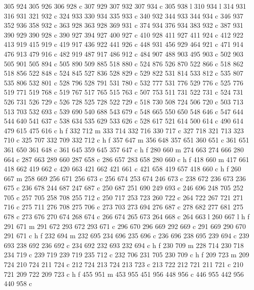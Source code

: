{{   305 924 305 926 306 928 c
   307 929 307 932 307 934 c
   305 938 l
   310 934 l
   314 931 316 931 321 932 c
   324 933 330 934 335 933 c
   340 932 344 933 344 934 c
   346 937 352 936 358 932 c
   363 928 363 928 369 931 c
   374 934 376 934 383 932 c
   387 931 390 929 390 928 c
   390 927 394 927 400 927 c
   410 928 411 927 411 924 c
   412 922 413 919 415 919 c
   419 917 436 922 441 926 c
   448 931 456 929 464 921 c
   471 914 476 913 479 916 c
   482 919 487 917 486 912 c
   484 907 488 903 495 903 c
   502 903 505 901 505 894 c
   505 890 509 885 518 880 c
   524 876 526 870 522 866 c
   518 862 518 856 522 848 c
   524 845 527 836 528 829 c
   529 822 531 814 533 812 c
   535 807 535 806 532 801 c
   528 796 528 791 531 780 c
   532 777 531 776 529 776 c
   525 776 519 771 519 768 c
   519 767 517 765 515 763 c
   507 753 511 731 522 731 c
   524 731 526 731 526 729 c
   526 728 525 728 522 729 c
   518 730 508 724 506 720 c
   503 713 513 703 532 693 c
   539 690 540 688 543 679 c
   548 665 550 650 548 646 c
   547 644 544 640 541 637 c
   538 634 535 629 533 626 c
   528 617 521 614 500 614 c
   490 614 479 615 475 616 c
   h f
   332 712 m
   333 714 332 716 330 717 c
   327 718 321 713 323 710 c
   325 707 332 709 332 712 c
   h f
   357 647 m
   356 648 357 651 360 651 c
   361 651 361 650 361 648 c
   361 645 359 645 357 647 c
   h f
   280 660 m
   274 663 274 666 280 664 c
   287 663 289 660 287 658 c
   286 657 283 658 280 660 c
   h f
   418 660 m
   417 661 418 662 419 662 c
   420 663 421 662 421 661 c
   421 658 419 657 418 660 c
   h f
   260 667 m
   258 669 256 671 256 673 c
   256 674 253 674 246 673 c
   238 672 236 673 236 675 c
   236 678 244 687 247 687 c
   250 687 251 690 249 693 c
   246 696 248 705 252 705 c
   257 705 258 708 255 712 c
   250 717 253 723 260 722 c
   264 722 267 721 271 716 c
   275 711 276 708 275 706 c
   273 703 273 694 276 687 c
   278 682 277 681 275 678 c
   273 676 270 674 268 674 c
   266 674 265 673 264 668 c
   264 663 l
   260 667 l
   h f
   291 671 m
   291 672 293 672 293 671 c
   296 670 296 669 292 669 c
   291 669 290 670 291 671 c
   h f
   232 694 m
   232 695 234 696 235 696 c
   236 696 238 695 239 694 c
   239 693 238 692 236 692 c
   234 692 232 693 232 694 c
   h f
   230 709 m
   228 714 230 718 234 719 c
   239 719 239 719 235 712 c
   232 706 231 705 230 709 c
   h f
   209 723 m
   209 724 210 724 211 724 c
   212 724 213 724 213 723 c
   213 722 212 721 211 721 c
   210 721 209 722 209 723 c
   h f
   455 951 m
   453 955 451 956 448 956 c
   446 955 442 956 440 958 c
}}
